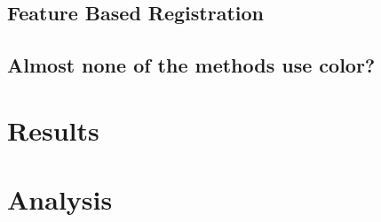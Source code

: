 \documentclass[a4paper]{article}
\begin{document}
\subsection{Feature Based Registration}

\subsection{Almost none of the methods use color?}


\section{Results}




\section{Analysis}




{}

\end{document}
